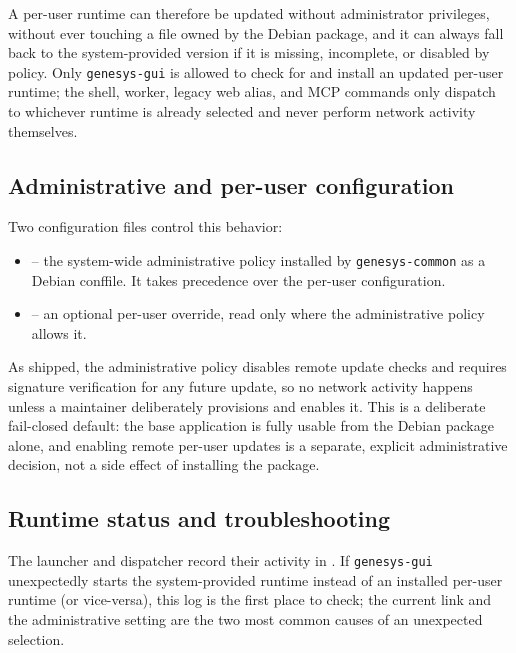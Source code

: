 A per-user runtime can therefore be updated without administrator privileges,
without ever touching a file owned by the Debian package, and it can always
fall back to the system-provided version if it is missing, incomplete, or
disabled by policy. Only \texttt{genesys-gui} is allowed to check for and
install an updated per-user runtime; the shell, worker, legacy web alias, and
MCP commands only dispatch to whichever runtime is already selected and never
perform network activity themselves.

\subsection{Administrative and per-user configuration}
\label{subsec:user-installation-update-configuration}

Two configuration files control this behavior:
\begin{itemize}
\item {} -- the system-wide administrative
  policy installed by \texttt{genesys-common} as a Debian conffile. It takes
  precedence over the per-user configuration.
\item {} -- an optional per-user override,
  read only where the administrative policy allows it.
\end{itemize}

As shipped, the administrative policy disables remote update checks and
requires signature verification for any future update, so no network activity
happens unless a maintainer deliberately provisions and enables it. This is a
deliberate fail-closed default: the base application is fully usable from the
Debian package alone, and enabling remote per-user updates is a separate,
explicit administrative decision, not a side effect of installing the
package.

\subsection{Runtime status and troubleshooting}
\label{subsec:user-installation-launcher-log}

The launcher and dispatcher record their activity in
. If \texttt{genesys-gui} unexpectedly
starts the system-provided runtime instead of an installed per-user runtime
(or vice-versa), this log is the first place to check; the current
 link and the administrative
 setting are the two most common causes of an
unexpected selection.

